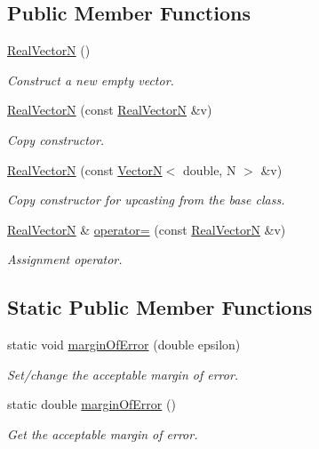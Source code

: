 \subsection*{\-Public \-Member \-Functions}
\begin{DoxyCompactItemize}
\item 
\hyperlink{classmetrobotics_1_1RealVectorN_a54bb8a300c85354940f5712952d4fc03}{\-Real\-Vector\-N} ()
\begin{DoxyCompactList}\small\item\em \-Construct a new empty vector. \end{DoxyCompactList}\item 
\hyperlink{classmetrobotics_1_1RealVectorN_aa4b10a33e9331bd34ab6d230cd3b6dcc}{\-Real\-Vector\-N} (const \hyperlink{classmetrobotics_1_1RealVectorN}{\-Real\-Vector\-N} \&v)
\begin{DoxyCompactList}\small\item\em \-Copy constructor. \end{DoxyCompactList}\item 
\hyperlink{classmetrobotics_1_1RealVectorN_a4c559f7cf9d6db280ec33a0c16b65b90}{\-Real\-Vector\-N} (const \hyperlink{classmetrobotics_1_1VectorN}{\-Vector\-N}$<$ double, \-N $>$ \&v)
\begin{DoxyCompactList}\small\item\em \-Copy constructor for {\itshape upcasting\/} from the base class. \end{DoxyCompactList}\item 
\hyperlink{classmetrobotics_1_1RealVectorN}{\-Real\-Vector\-N} \& \hyperlink{classmetrobotics_1_1RealVectorN_aac6a7d96a211e6110013908c42ba96b8}{operator=} (const \hyperlink{classmetrobotics_1_1RealVectorN}{\-Real\-Vector\-N} \&v)
\begin{DoxyCompactList}\small\item\em \-Assignment operator. \end{DoxyCompactList}\end{DoxyCompactItemize}
\subsection*{\-Static \-Public \-Member \-Functions}
\begin{DoxyCompactItemize}
\item 
static void \hyperlink{classmetrobotics_1_1RealVectorN_a3c5ccee2ad0e7f40a7f99dcf8c4c7837}{margin\-Of\-Error} (double epsilon)
\begin{DoxyCompactList}\small\item\em \-Set/change the acceptable margin of error. \end{DoxyCompactList}\item 
static double \hyperlink{classmetrobotics_1_1RealVectorN_a75f4405dc254c9481776818506ad6817}{margin\-Of\-Error} ()
\begin{DoxyCompactList}\small\item\em \-Get the acceptable margin of error. \end{DoxyCompactList}\end{DoxyCompactItemize}


